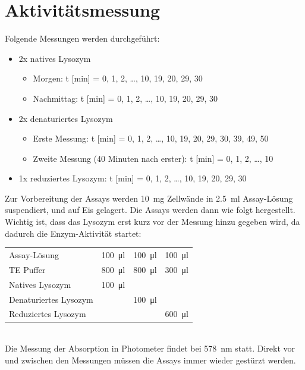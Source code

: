 \documentclass[a4paper,german]{scrreprt}
\begin{document}
\section{Aktivitätsmessung}

Folgende Messungen werden durchgeführt:
\begin{itemize}
	\item 2x natives Lysozym
		\begin{itemize}
			\item Morgen: t [min] = 0, 1, 2, \ldots, 10, 19, 20, 29, 30
			\item Nachmittag: t [min] = 0, 1, 2, \ldots, 10, 19, 20, 29, 30
		\end{itemize}
	\item 2x denaturiertes Lysozym
		\begin{itemize}
			\item Erste Messung: t [min] = 0, 1, 2, \ldots, 10, 19, 20, 29, 30, 39, 49, 50
			\item Zweite Messung (40 Minuten nach erster): t [min] = 0, 1, 2, \ldots, 10
		\end{itemize}
	\item 1x reduziertes Lysozym: t [min] = 0, 1, 2, \ldots, 10, 19, 20, 29, 30
\end{itemize}

Zur Vorbereitung der Assays werden \SI{10}{mg} Zellwände in \SI{2.5}{ml}
Assay-Lösung suspendiert, und auf Eis gelagert. Die Assays werden dann wie
folgt hergestellt. Wichtig ist, dass das Lysozym erst kurz vor der Messung
hinzu gegeben wird, da dadurch die Enzym-Aktivität startet:
\\

\begin{tabular}{|l|l|l|l|}
	\hline
	Assay-Lösung          & \SI{100}{\ul} & \SI{100}{\ul} & \SI{100}{\ul} \\
	TE Puffer             & \SI{800}{\ul} & \SI{800}{\ul} & \SI{300}{\ul} \\
	Natives Lysozym       & \SI{100}{\ul} &               &               \\
	Denaturiertes Lysozym &               & \SI{100}{\ul} &               \\
	Reduziertes Lysozym   &               &               & \SI{600}{\ul} \\
	\hline
\end{tabular}
\\

Die Messung der Absorption in Photometer findet bei \SI{578}{nm} statt.  Direkt
vor und zwischen den Messungen müssen die Assays immer wieder gestürzt werden.
\end{document}
